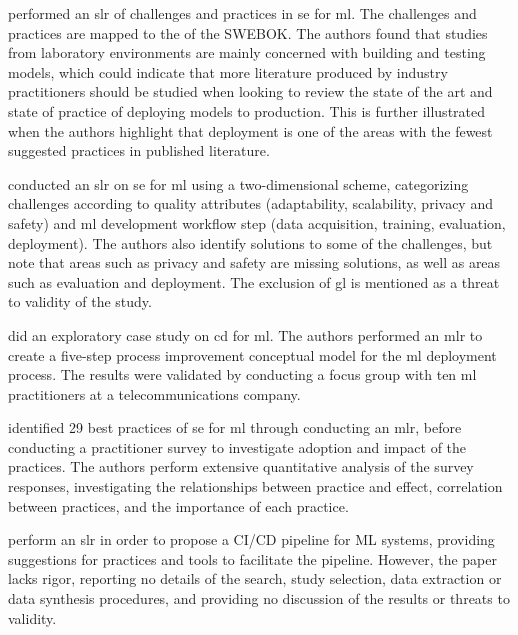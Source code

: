 \textcite{Nascimento2020} performed an \acrshort{slr} of challenges and practices in \acrshort{se} for \acrshort{ml}. The challenges and practices are mapped to the  of the SWEBOK.
The authors found that studies from laboratory environments are mainly concerned with building and testing models, which could indicate that more literature produced by industry practitioners should be studied when looking to review the state of the art and state of practice of deploying models to production.
This is further illustrated when the authors highlight that deployment is one of the areas with the fewest suggested practices in published literature.

\textcite{Lwakatare2020} conducted an \acrshort{slr} on  \acrshort{se} for \acrshort{ml} using a two-dimensional scheme, categorizing challenges according to quality attributes (adaptability, scalability, privacy and safety) and \acrshort{ml} development workflow step (data acquisition, training, evaluation, deployment).
The authors also identify solutions to some of the challenges, but note that areas such as privacy and safety are missing solutions, as well as areas such as evaluation and deployment.
The exclusion of \acrshort{gl} is mentioned as a threat to validity of the study.

\textcite{Lwakatare2020a} did an exploratory case study on \acrshort{cd} for \acrshort{ml}.
The authors performed an \acrshort{mlr} to create a five-step process improvement conceptual model for the \acrshort{ml} deployment process. 
The results were validated by conducting a focus group with ten \acrshort{ml} practitioners at a telecommunications company.

\textcite{Serban2020} identified 29 best practices of \acrshort{se} for \acrshort{ml} through conducting an \acrshort{mlr}, before conducting a practitioner survey to investigate adoption and impact of the practices.
The authors perform extensive quantitative analysis of the survey responses, investigating the relationships between practice and effect, correlation between practices, and the importance of each practice.

\textcite{Karamitsos2020} perform an \acrshort{slr} in order to propose a CI/CD pipeline for ML systems, providing suggestions for practices and tools to facilitate the pipeline.
However, the paper lacks rigor, reporting no details of the search, study selection, data extraction or data synthesis procedures, and providing no discussion of the results or threats to validity.

